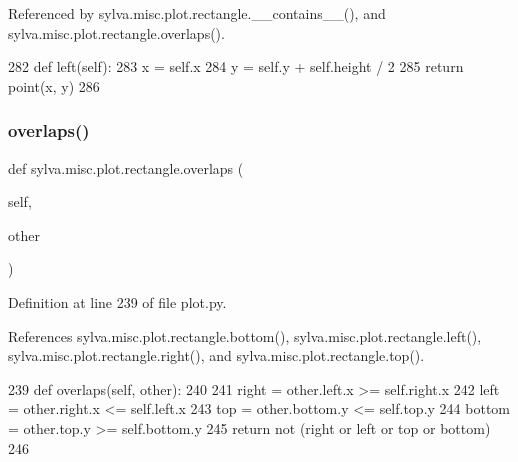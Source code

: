 Referenced by sylva.\+misc.\+plot.\+rectangle.\+\_\+\+\_\+contains\+\_\+\+\_\+(), and sylva.\+misc.\+plot.\+rectangle.\+overlaps().


\begin{DoxyCode}
282         \textcolor{keyword}{def }left(self):
283             x = self.x
284             y = self.y + self.height / 2
285             \textcolor{keywordflow}{return} point(x, y)
286 
\end{DoxyCode}
\mbox{\label{classsylva_1_1misc_1_1plot_1_1rectangle_a95db845fde73592eef007ab940b8b140}} 
\subsubsection{\texorpdfstring{overlaps()}{overlaps()}}
{\footnotesize\ttfamily def sylva.\+misc.\+plot.\+rectangle.\+overlaps (\begin{DoxyParamCaption}\item[{}]{self,  }\item[{}]{other }\end{DoxyParamCaption})}



Definition at line 239 of file plot.\+py.



References sylva.\+misc.\+plot.\+rectangle.\+bottom(), sylva.\+misc.\+plot.\+rectangle.\+left(), sylva.\+misc.\+plot.\+rectangle.\+right(), and sylva.\+misc.\+plot.\+rectangle.\+top().


\begin{DoxyCode}
239         \textcolor{keyword}{def }overlaps(self, other):
240 
241             right = other.left.x >= self.right.x
242             left = other.right.x <= self.left.x
243             top = other.bottom.y <= self.top.y
244             bottom = other.top.y >= self.bottom.y
245             \textcolor{keywordflow}{return} \textcolor{keywordflow}{not} (right \textcolor{keywordflow}{or} left \textcolor{keywordflow}{or} top \textcolor{keywordflow}{or} bottom)
246 
\end{DoxyCode}
\mbox{\label{classsylva_1_1misc_1_1plot_1_1rectangle_a6395db39d40526291589390d31437f80}} 
